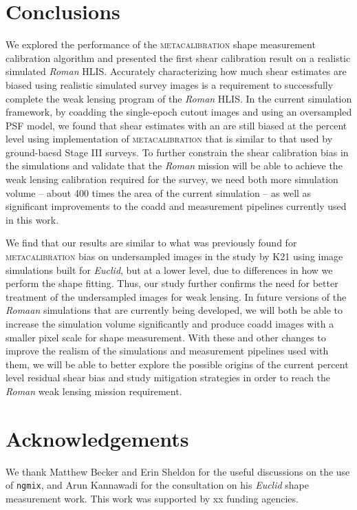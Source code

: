 \documentclass[fleqn,usenatbib]{mnras}
\begin{document}
\section{Conclusions}
We explored the performance of the \textsc{metacalibration} shape measurement calibration algorithm and presented the first shear calibration result on a realistic simulated \emph{Roman} HLIS. Accurately characterizing how much shear estimates are biased using realistic simulated survey images is a requirement to successfully complete the weak lensing program of the \emph{Roman} HLIS. In the current simulation framework, by coadding the single-epoch cutout images and using an oversampled PSF model, we found that shear estimates with an are still biased at the percent level using implementation of \textsc{metacalibration} that is similar to that used by ground-baesd Stage III surveys. To further constrain the shear calibration bias in the simulations and validate that the \emph{Roman} mission will be able to achieve the weak lensing calibration required for the survey, we need both more simulation volume -- about 400 times the area of the current simulation -- as well as significant improvements to the coadd and measurement pipelines currently used in this work. 

We find that our results are similar to what was previously found for \textsc{metacalibration} bias on undersampled images in the study by K21 using image simulations built for \emph{Euclid}, but at a lower level, due to differences in how we perform the shape fitting. Thus, our study further confirms the need for better treatment of the undersampled images for weak lensing. In future versions of the \emph{Romaan} simulations that are currently being developed, we will both be able to increase the simulation volume significantly and produce coadd images with a smaller pixel scale for shape measurement. With these and other changes to improve the realism of the simulations and measurement pipelines used with them, we will be able to better explore the possible origins of the current percent level residual shear bias and study mitigation strategies in order to reach the \emph{Roman} weak lensing mission requirement. 
\label{sec:conclusion}



\section{Acknowledgements}

We thank Matthew Becker and Erin Sheldon for the useful discussions on the use of \texttt{ngmix}, and Arun Kannawadi for the consultation on his \emph{Euclid} shape measurement work. This work was supported by xx funding agencies.
\end{document}
